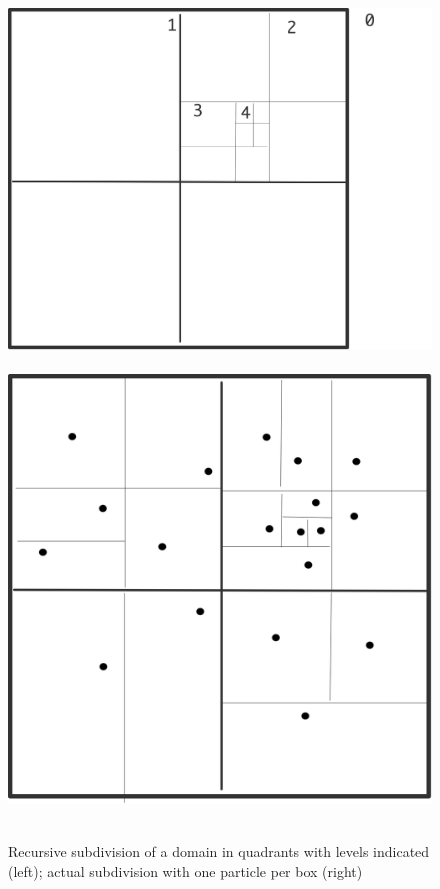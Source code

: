 \begin{figure}[ht]
  \hbox{%
  \includegraphics[scale=.1]{graphics-public/bh-quadrants}
  \includegraphics[scale=.1]{graphics-public/bh-quadrants-filled}%
  }
  \caption{Recursive subdivision of a domain in quadrants with levels
    indicated (left); actual subdivision with one particle per box (right)}
  \label{fig:bh-quadrants}
\end{figure}
